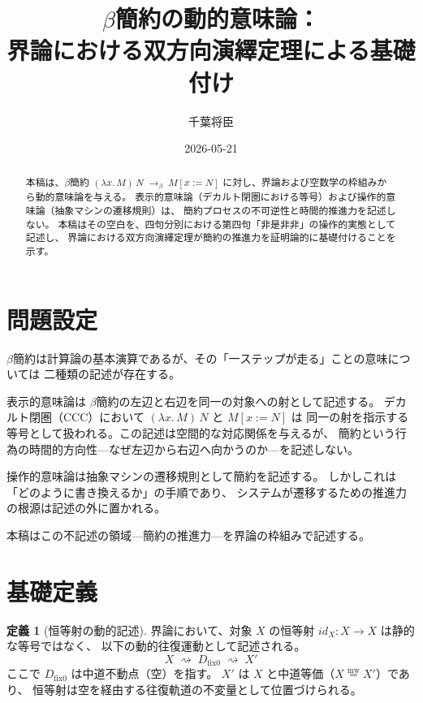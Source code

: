 \documentclass[11pt,a4paper]{ltjsarticle}
\newcommand{\mweq}{\mathrel{\overset{\mathrm{mw}}{=}}}
\newcommand{\dfix}{D_{\mathrm{fix}0}}
\theoremstyle{definition}
\newtheorem{definition}{定義}[section]
\begin{document}
\title{$\beta$簡約の動的意味論：\\
界論における双方向演繹定理による基礎付け}
\author{千葉将臣}
\date{2026-05-21}
\maketitle

\begin{abstract}
本稿は、$\beta$簡約
$(\lambda x.\, M)\, N \;\to_\beta\; M[x := N]$
に対し、界論および空数学の枠組みから動的意味論を与える。
表示的意味論（デカルト閉圏における等号）および操作的意味論（抽象マシンの遷移規則）は、
簡約プロセスの不可逆性と時間的推進力を記述しない。
本稿はその空白を、四句分別における第四句「非是非非」の操作的実態として記述し、
界論における双方向演繹定理が簡約の推進力を証明論的に基礎付けることを示す。
\end{abstract}

\section{問題設定}

$\beta$簡約は計算論の基本演算であるが、その「一ステップが走る」ことの意味については
二種類の記述が存在する。

表示的意味論は $\beta$簡約の左辺と右辺を同一の対象への射として記述する。
デカルト閉圏（CCC）において $(\lambda x.\, M)\, N$ と $M[x := N]$ は
同一の射を指示する等号として扱われる。この記述は空間的な対応関係を与えるが、
簡約という行為の時間的方向性---なぜ左辺から右辺へ向かうのか---を記述しない。

操作的意味論は抽象マシンの遷移規則として簡約を記述する。
しかしこれは「どのように書き換えるか」の手順であり、
システムが遷移するための推進力の根源は記述の外に置かれる。

本稿はこの不記述の領域---簡約の推進力---を界論の枠組みで記述する。

\section{基礎定義}

\begin{definition}[恒等射の動的記述]
界論において、対象 $X$ の恒等射 $id_X : X \to X$ は静的な等号ではなく、
以下の動的往復運動として記述される。
\[
X \;\rightsquigarrow\; \dfix \;\rightsquigarrow\; X'
\]
ここで $\dfix$ は中道不動点（空）を指す。
$X'$ は $X$ と中道等価（$X \mweq X'$）であり、
恒等射は空を経由する往復軌道の不変量として位置づけられる。
\end{definition}
\end{document}
